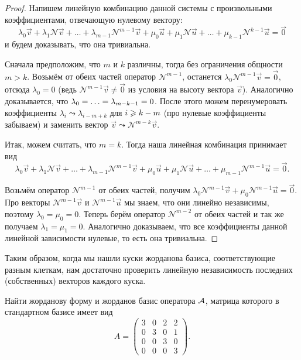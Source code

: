 \begin{proof}
	Напишем линейную комбинацию данной системы с произвольными коэффициентами, отвечающую нулевому вектору:
	\[
		\lambda_0\vec{v} + \lambda_1\mathcal{N}\vec{v} + \ldots + \lambda_{m - 1}\mathcal{N}^{m - 1}\vec{v} + \mu_0\vec{u} + \mu_1\mathcal{N}\vec{u} + \ldots + \mu_{k - 1}\mathcal{N}^{k - 1}\vec{u} = \vec{0}
	\]
	и будем доказывать, что она тривиальна.

	Сначала предположим, что $m$ и $k$ различны, тогда без ограничения общности $m > k$. Возьмём от обеих частей оператор $\mathcal{N}^{m - 1}$, останется $\lambda_0\mathcal{N}^{m - 1}\vec{v} = \vec{0}$, отсюда $\lambda_0 = 0$ (ведь $\mathcal{N}^{m - 1}\vec{v} \ne \vec{0}$ из условия на высоту вектора $\vec{v}$). Аналогично доказывается, что $\lambda_0 = \ldots \hm= \lambda_{m - k - 1} = 0$. После этого можем перенумеровать коэффициенты $\lambda_i \leadsto \lambda_{i - m + k}$ для $i \hm\geqslant k - m$ (про нулевые коэффициенты забываем) и заменить вектор $\vec{v} \leadsto \mathcal{N}^{m - k}\vec{v}$.

	Итак, можем считать, что $m = k$. Тогда наша линейная комбинация принимает вид
	\[
		\lambda_0\vec{v} + \lambda_1\mathcal{N}\vec{v} + \ldots + \lambda_{m - 1}\mathcal{N}^{m - 1}\vec{v} + \mu_0\vec{u} + \mu_1\mathcal{N}\vec{u} + \ldots + \mu_{m - 1}\mathcal{N}^{m - 1}\vec{u} = \vec{0}.
	\]

	Возьмём оператор $\mathcal{N}^{m - 1}$ от обеих частей, получим $\lambda_0\mathcal{N}^{m - 1}\vec{v} + \mu_0\mathcal{N}^{m - 1}\vec{u} = \vec{0}$. Про векторы $\mathcal{N}^{m - 1}\vec{v}$ и $\mathcal{N}^{m - 1}\vec{u}$ мы знаем, что они линейно независимы, поэтому $\lambda_0 = \mu_0 = 0$. Теперь берём оператор $\mathcal{N}^{m - 2}$ от обеих частей и так же получаем $\lambda_1 = \mu_1 = 0$. Аналогично доказываем, что все коэффициенты данной линейной зависимости нулевые, то есть она тривиальна.
\end{proof}

Таким образом, когда мы нашли куски жорданова базиса, соответствующие разным клеткам, нам достаточно проверить линейную независимость последних (собственных) векторов каждого куска.

\begin{problem}
	Найти жорданову форму и жорданов базис оператора $\mathcal{A}$, матрица которого в стандартном базисе имеет вид
	\[
		A =
		\begin{pmatrix}
			3 & 0 & 2 & 2\\
			0 & 3 & 0 & 1\\
			0 & 0 & 3 & 0\\
			0 & 0 & 0 & 3
		\end{pmatrix}.
	\]
\end{problem}

